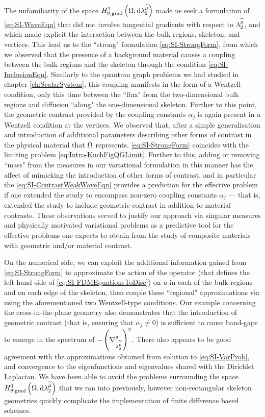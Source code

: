 The unfamiliarity of the space $H^1_{\theta, \mathrm{grad}}\left( \Omega, \mathrm{d}\lambda_2^{\widetilde{\mu}} \right)$ made us seek a formulation of \eqref{eq:SI-WaveEqn} that did not involve tangential gradients with respect to $\lambda_2^{\widetilde{\mu}}$, and which made explicit the interaction between the bulk regions, skeleton, and vertices.
This lead us to the ``strong" formulation \eqref{eq:SI-StrongForm}, from which we observed that the presence of a background material causes a coupling between the bulk regions and the skeleton through the condition \eqref{eq:SI-InclusionEqn}.
Similarly to the quantum graph problems we had studied in chapter \ref{ch:ScalarSystem}, this coupling manifests in the form of a Wentzell condition, only this time between the ``flux" from the two-dimensional bulk regions and diffusion ``along" the one-dimensional skeleton.
Further to this point, the geometric contrast provided by the coupling constants $\alpha_j$ is again present in a Wentzell condition at the vertices.
We observed that, after a simple generalisation and introduction of additional parameters describing other forms of contrast in the physical material that $\Omega$ represents, \eqref{eq:SI-StrongForm} coincides with the limiting problem \eqref{eq:Intro-KuchFigQGLimit}.
Further to this, adding or removing ``mass" from the measures in our variational formulation in this manner has the affect of mimicking the introduction of other forms of contrast, and in particular the \eqref{eq:SI-ContrastWeakWaveEqn} provides a prediction for the effective problem if one extended the study \cite{figotin1998spectral} to encompass non-zero coupling constants $\alpha_j$ --- that is, extended the study to include geometric contrast in addition to material contrasts.
These observations served to justify our approach via singular measures and physically motivated variational problems as a predictive tool for the effective problems one expects to obtain from the study of composite materials with geometric and/or material contrast.

On the numerical side, we can exploit the additional information gained from \eqref{eq:SI-StrongForm} to approximate the action of the operator (that defines the left hand side of \eqref{eq:SI-FDMEquationsToDisc}) on $u$ in each of the bulk regions and on each edge of the skeleton, then couple these ``regional" approximations via using the aforementioned two Wentzell-type conditions.
Our example concerning the cross-in-the-plane geometry also demonstrates that the introduction of geometric contrast (that is, ensuring that $\alpha_j\neq0$) is sufficient to cause band-gaps to emerge in the spectrum of $-\left( \nabla^{\theta}_{\lambda_2^{\widetilde{\mu}}} \right)^2$.
There also appears to be good agreement with the approximations obtained from solution to \eqref{eq:SI-VarProb}, and convergence to the eigenfunctions and eigenvalues shared with the Dirichlet Laplacian.
We have been able to avoid the problems surrounding the space $H^1_{\theta, \mathrm{grad}}\left( \Omega, \mathrm{d}\lambda_2^{\widetilde{\mu}} \right)$ that we ran into previously, however non-rectangular skeleton geometries quickly complicate the implementation of finite difference based schemes.

